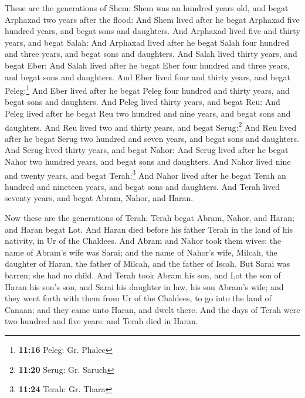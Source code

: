  These are the generations of Shem: Shem was an hundred
years old, and begat Arphaxad two years after the flood: 
And Shem lived after he begat Arphaxad five hundred years, and begat
sons and daughters.  And Arphaxad lived five and thirty
years, and begat Salah:  And Arphaxad lived after he
begat Salah four hundred and three years, and begat sons and daughters.
 And Salah lived thirty years, and begat Eber:
 And Salah lived after he begat Eber four hundred and
three years, and begat sons and daughters.  And Eber
lived four and thirty years, and begat Peleg:\footnote{\textbf{11:16}
  Peleg: Gr. Phalec}  And Eber lived after he begat Peleg
four hundred and thirty years, and begat sons and daughters.
 And Peleg lived thirty years, and begat Reu:
 And Peleg lived after he begat Reu two hundred and nine
years, and begat sons and daughters.  And Reu lived two
and thirty years, and begat Serug:\footnote{\textbf{11:20} Serug: Gr.
  Saruch}  And Reu lived after he begat Serug two hundred
and seven years, and begat sons and daughters.  And Serug
lived thirty years, and begat Nahor:  And Serug lived
after he begat Nahor two hundred years, and begat sons and daughters.
 And Nahor lived nine and twenty years, and begat
Terah:\footnote{\textbf{11:24} Terah: Gr. Thara}  And
Nahor lived after he begat Terah an hundred and nineteen years, and
begat sons and daughters.  And Terah lived seventy years,
and begat Abram, Nahor, and Haran.

 Now these are the generations of Terah: Terah begat
Abram, Nahor, and Haran; and Haran begat Lot.  And Haran
died before his father Terah in the land of his nativity, in Ur of the
Chaldees.  And Abram and Nahor took them wives: the name
of Abram's wife was Sarai; and the name of Nahor's wife, Milcah, the
daughter of Haran, the father of Milcah, and the father of Iscah.
 But Sarai was barren; she had no child. 
And Terah took Abram his son, and Lot the son of Haran his son's son,
and Sarai his daughter in law, his son Abram's wife; and they went forth
with them from Ur of the Chaldees, to go into the land of Canaan; and
they came unto Haran, and dwelt there.  And the days of
Terah were two hundred and five years: and Terah died in Haran.

